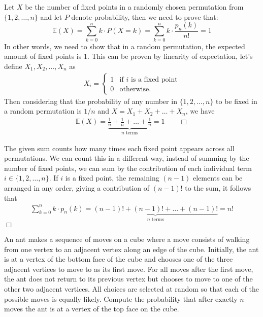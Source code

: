\begin{solution}
    Let $X$ be the number of fixed points in a randomly chosen permutation from $\{1,2, \ldots, n\}$ and let $P$ denote probability, then we need to prove that:
    $$\mathbb{E}(X) = \sum_{k=0}^n k \cdot P(X=k)  = \sum_{k=0}^n k \cdot \frac{p_n(k)}{n!} = 1$$
    In other words, we need to show that in a random permutation, the expected amount of fixed points is 1. This can be proven by linearity of expectation, let's define $X_1, X_2, \ldots, X_n$ as
    \begin{align*}
        X_i = 
        \begin{cases}
            1 & \text{if $i$ is a fixed point} \\
            0 &\text{otherwise.}
        \end{cases}
    \end{align*}
    Then considering that the probability of any number in $\{ 1, 2, \ldots, n\}$ to be fixed in a random permutation is $1/n$ and $X=X_1 + X_2 + \ldots + X_n$, we have
    \begin{align*}
        \mathbb{E}(X) = \underbrace{ \frac{1}{n} + \frac{1}{n} + \ldots + \frac{1}{n}}_{n \text{ terms}} = 1 \qquad\Box
    \end{align*}
\end{solution}

\begin{solution}
    The given sum counts how many times each fixed point appears across all permutations. We can count this in a different way, instead of summing by the number of fixed points, we can sum by the contribution of each individual term $i \in \{1, 2, \ldots, n \}$. If $i$ is a fixed point, the remaining $(n-1)$ elements can be arranged in any order, giving a contribution of $(n-1)!$ to the sum, it follows that
    \begin{align*}
        \sum_{k=0}^n k \cdot p_n(k) = \underbrace{ (n-1)! + (n-1)! + \ldots + (n-1)!}_{n \text{ terms}} = n!
    \end{align*}
    $\Box$
\end{solution}

\begin{problem}[P][5][AIME II 2021/8]
    An ant makes a sequence of moves on a cube where a move consists of walking from one vertex to an adjacent vertex along an edge of the cube. Initially, the ant is at a vertex of the bottom face of the cube and chooses one of the three adjacent vertices to move to as its first move. For all moves after the first move, the ant does not return to its previous vertex but chooses to move to one of the other two adjacent vertices. All choices are selected at random so that each of the possible moves is equally likely. Compute the probability that after exactly $n$ moves the ant is at a vertex of the top face on the cube.
\end{problem}

